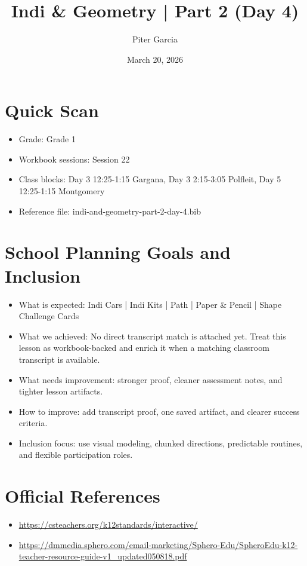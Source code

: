 \documentclass[11pt]{article}
\title{Indi & Geometry | Part 2 (Day 4)}
\author{Piter Garcia}
\date{March 20, 2026}
\begin{document}
    \maketitle
    \section*{Quick Scan}
    \begin{itemize}[leftmargin=*]
    \item Grade: Grade 1
    \item Workbook sessions: Session 22
    \item Class blocks: Day 3 12:25-1:15 Gargana, Day 3 2:15-3:05 Polfleit, Day 5 12:25-1:15 Montgomery
    \item Reference file: indi-and-geometry-part-2-day-4.bib
    \end{itemize}
    \section*{School Planning Goals and Inclusion}
    \begin{itemize}[leftmargin=*]
    \item What is expected: Indi Cars | Indi Kits | Path | Paper & Pencil | Shape Challenge Cards
    \item What we achieved: No direct transcript match is attached yet. Treat this lesson as workbook-backed and enrich it when a matching classroom transcript is available.
    \item What needs improvement: stronger proof, cleaner assessment notes, and tighter lesson artifacts.
    \item How to improve: add transcript proof, one saved artifact, and clearer success criteria.
    \item Inclusion focus: use visual modeling, chunked directions, predictable routines, and flexible participation roles.
    \end{itemize}
    \section*{Official References}
    \begin{itemize}[leftmargin=*]
    \item \url{https://csteachers.org/k12standards/interactive/}
\item \url{https://dmmedia.sphero.com/email-marketing/Sphero-Edu/SpheroEdu-k12-teacher-resource-guide-v1_updated050818.pdf}

    \end{itemize}
    
\end{document}
